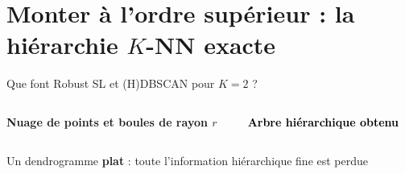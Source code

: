 \documentclass[A4,svgnames,9pt,aspectratio=169]{beamer}
\begin{document}
\section{\texorpdfstring{Monter à l'\textcolor{inria-rouge}{ordre supérieur} : la hiérarchie $K$-NN exacte}{Monter à l'ordre supérieur : la hiérarchie K-NN exacte}}
\frame{\sectionpage}

\begin{frame}{Que font Robust SL et (H)DBSCAN pour $K = 2$ ?}
    \begin{columns}[c, onlytextwidth]
        \begin{column}{0.52\textwidth}
            \begin{center}
                \textbf{Nuage de points et boules de rayon $r$}

                \vspace{0.4cm}
                
            \end{center}
        \end{column}

        \begin{column}{0.44\textwidth}
            \begin{center}
                \textcolor{black}{\textbf{Arbre hiérarchique obtenu}}

                \vspace{0.4cm}
                
            \end{center}
        \end{column}
    \end{columns}
    \vspace{0.3cm}
    \begin{center}
        \small Un dendrogramme \textbf{plat} : toute l'information hiérarchique fine est perdue
    \end{center}
\end{frame}
\end{document}
